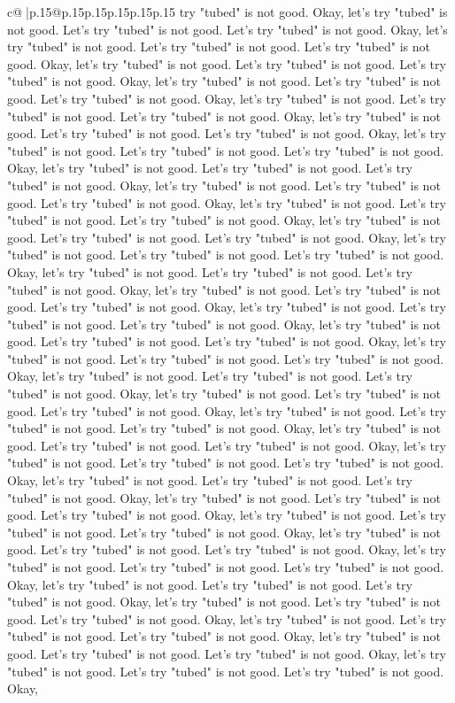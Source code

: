 \documentclass{article}
\begin{document}
{\begin{supertabular}{c@{$\;$}|p{.15\linewidth}@{}p{.15\linewidth}p{.15\linewidth}p{.15\linewidth}p{.15\linewidth}p{.15\linewidth}}
{{{try "tubed" is not good. Okay, let's try "tubed" is not good. Let's try "tubed" is not good. Let's try "tubed" is not good. Okay, let's try "tubed" is not good. Let's try "tubed" is not good. Let's try "tubed" is not good. Okay, let's try "tubed" is not good. Let's try "tubed" is not good. Let's try "tubed" is not good. Okay, let's try "tubed" is not good. Let's try "tubed" is not good. Let's try "tubed" is not good. Okay, let's try "tubed" is not good. Let's try "tubed" is not good. Let's try "tubed" is not good. Okay, let's try "tubed" is not good. Let's try "tubed" is not good. Let's try "tubed" is not good. Okay, let's try "tubed" is not good. Let's try "tubed" is not good. Let's try "tubed" is not good. Okay, let's try "tubed" is not good. Let's try "tubed" is not good. Let's try "tubed" is not good. Okay, let's try "tubed" is not good. Let's try "tubed" is not good. Let's try "tubed" is not good. Okay, let's try "tubed" is not good. Let's try "tubed" is not good. Let's try "tubed" is not good. Okay, let's try "tubed" is not good. Let's try "tubed" is not good. Let's try "tubed" is not good. Okay, let's try "tubed" is not good. Let's try "tubed" is not good. Let's try "tubed" is not good. Okay, let's try "tubed" is not good. Let's try "tubed" is not good. Let's try "tubed" is not good. Okay, let's try "tubed" is not good. Let's try "tubed" is not good. Let's try "tubed" is not good. Okay, let's try "tubed" is not good. Let's try "tubed" is not good. Let's try "tubed" is not good. Okay, let's try "tubed" is not good. Let's try "tubed" is not good. Let's try "tubed" is not good. Okay, let's try "tubed" is not good. Let's try "tubed" is not good. Let's try "tubed" is not good. Okay, let's try "tubed" is not good. Let's try "tubed" is not good. Let's try "tubed" is not good. Okay, let's try "tubed" is not good. Let's try "tubed" is not good. Let's try "tubed" is not good. Okay, let's try "tubed" is not good. Let's try "tubed" is not good. Let's try "tubed" is not good. Okay, let's try "tubed" is not good. Let's try "tubed" is not good. Let's try "tubed" is not good. Okay, let's try "tubed" is not good. Let's try "tubed" is not good. Let's try "tubed" is not good. Okay, let's try "tubed" is not good. Let's try "tubed" is not good. Let's try "tubed" is not good. Okay, let's try "tubed" is not good. Let's try "tubed" is not good. Let's try "tubed" is not good. Okay, let's try "tubed" is not good. Let's try "tubed" is not good. Let's try "tubed" is not good. Okay, let's try "tubed" is not good. Let's try "tubed" is not good. Let's try "tubed" is not good. Okay, let's try "tubed" is not good. Let's try "tubed" is not good. Let's try "tubed" is not good. Okay, let's try "tubed" is not good. Let's try "tubed" is not good. Let's try "tubed" is not good. Okay, let's try "tubed" is not good. Let's try "tubed" is not good. Let's try "tubed" is not good. Okay, let's try "tubed" is not good. Let's try "tubed" is not good. Let's try "tubed" is not good. Okay, let's try "tubed" is not good. Let's try "tubed" is not good. Let's try "tubed" is not good. Okay, let's try "tubed" is not good. Let's try "tubed" is not good. Let's try "tubed" is not good. Okay, }}}
\end{supertabular}}
\end{document}
